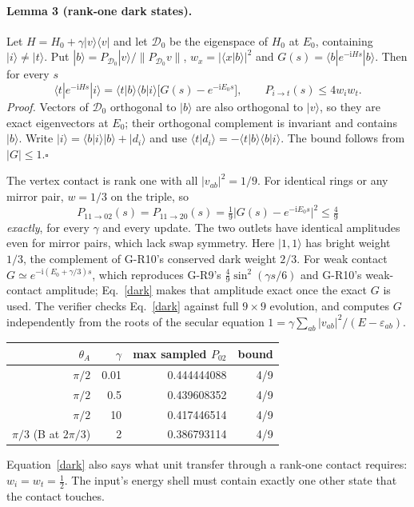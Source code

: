 \documentclass[11pt,a4paper]{article}
\newcommand{\ii}{\mathrm i}
\newcommand{\ket}[1]{|#1\rangle}
\newcommand{\bra}[1]{\langle#1|}
\begin{document}
\paragraph{Lemma 3 (rank-one dark states).}
Let $H=H_0+\gamma\ket v\bra v$ and let $\mathcal D_0$ be the eigenspace of
$H_0$ at $E_0$, containing $\ket i\neq\ket t$. Put
$\ket b=P_{\mathcal D_0}\ket v/\|P_{\mathcal D_0}v\|$,
$w_x=|\langle x|b\rangle|^2$ and $G(s)=\bra b e^{-\ii Hs}\ket b$. Then for
every $s$
\begin{equation}
 \bra t e^{-\ii Hs}\ket i=\langle t|b\rangle\langle b|i\rangle
 \big[G(s)-e^{-\ii E_0s}\big],\qquad P_{i\to t}(s)\le4w_iw_t.\label{dark}
\end{equation}
\emph{Proof.} Vectors of $\mathcal D_0$ orthogonal to $\ket b$ are also
orthogonal to $\ket v$, so they are exact eigenvectors at $E_0$; their
orthogonal complement is invariant and contains $\ket b$. Write
$\ket i=\langle b|i\rangle\ket b+\ket{d_i}$ and use
$\langle t|d_i\rangle=-\langle t|b\rangle\langle b|i\rangle$. The bound
follows from $|G|\le1$.\hfill$\square$

The vertex contact is rank one with all $|v_{ab}|^2=1/9$. For identical
rings or any mirror pair, $w=1/3$ on the triple, so
\begin{equation}
 P_{11\to02}(s)=P_{11\to20}(s)=\tfrac19\big|G(s)-e^{-\ii E_0s}\big|^2\le\tfrac49
\end{equation}
\emph{exactly}, for every $\gamma$ and every update. The two outlets have
identical amplitudes even for mirror pairs, which lack swap symmetry.
Here $\ket{1,1}$ has bright weight $1/3$, the complement of G-R10's
conserved dark weight $2/3$. For weak contact
$G\simeq e^{-\ii(E_0+\gamma/3)s}$, which reproduces G-R9's
$\frac49\sin^2(\gamma s/6)$ and G-R10's weak-contact amplitude; Eq.~\eqref{dark}
makes that amplitude exact once the exact $G$ is used. The verifier checks Eq.~\eqref{dark} against
full $9\times9$ evolution, and computes $G$ independently from the roots of
the secular equation $1=\gamma\sum_{ab}|v_{ab}|^2/(E-\varepsilon_{ab})$.

\begin{center}
\begin{tabular}{rrrr}\toprule
$\theta_A$ & $\gamma$ & max sampled $P_{02}$ & bound\\\midrule
$\pi/2$ & 0.01 & 0.444444088 & 4/9\\
$\pi/2$ & 0.5 & 0.439608352 & 4/9\\
$\pi/2$ & 10 & 0.417446514 & 4/9\\
$\pi/3$ (B at $2\pi/3$) & 2 & 0.386793114 & 4/9\\\bottomrule
\end{tabular}
\end{center}
Equation~\eqref{dark} also says what unit transfer through a rank-one
contact requires: $w_i=w_t=\tfrac12$. The input's energy shell must contain
exactly one other state that the contact touches.
\end{document}
